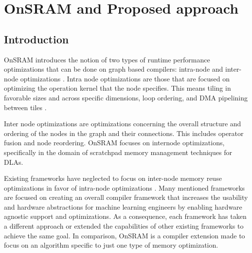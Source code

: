
\chapter{OnSRAM and Proposed approach} %

\label{Chapter3} %


\section{Introduction}


OnSRAM introduces the notion of two types of runtime performance optimizations
that can be done on graph based compilers: intra-node and inter-node
optimizations \cite{onsram}. Intra node optimizations are those that are
focused on optimizing the operation kernel that the node specifies. This means
tiling in favorable sizes and across specific dimensions, loop ordering, and
DMA pipelining between tiles \cite{aladdin}.

Inter node optimizations are optimizations concerning the overall structure and
ordering of the nodes in the graph and their connections. This includes
operator fusion and node reordering\cite{onsram}.
OnSRAM focuses on internode optimizations, specifically in the domain of
scratchpad memory management techniques for DLAs. 

Existing frameworks have neglected to focus on inter-node memory reuse
optimizations in favor of intra-node optimizations \cite{TVM} \cite{deeptools}
\cite{tensorflow}. Many mentioned frameworks are focused on creating an overall
compiler framework that increases the usability and hardware abstractions for
machine learning engineers by enabling hardware agnostic support and
optimizations. As a consequence, each framework has taken a different approach
or extended the capabilities of other existing frameworks to achieve the same
goal. In comparison, OnSRAM is a compiler extension made to focus on an
algorithm specific to just one type of memory optimization.

